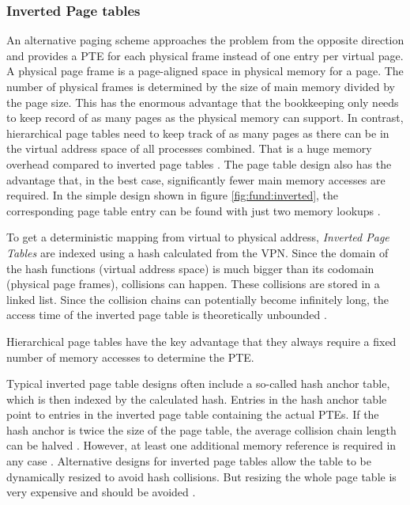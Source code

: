 \subsubsection{Inverted Page tables}
An alternative paging scheme approaches the problem from the opposite direction and provides a PTE
for each physical frame instead of one entry per virtual page.
A physical page frame is a page-aligned space in physical memory for a page.
The number of physical frames is determined by the size of main memory divided by the page size.
This has the enormous advantage that the bookkeeping only needs to keep record of as many pages
as the physical memory can support.
In contrast, hierarchical page tables need to keep track of as many pages as there can be in the virtual
address space of all processes combined. That is a huge memory overhead compared to inverted page tables
\cite{jacob1998look}.
The page table design also has the advantage that, in the best case, significantly fewer main memory
accesses are required. In the simple design shown in figure \ref{fig:fund:inverted}, the corresponding
page table entry can be found with just two memory lookups \cite{skarlatos2020elastic}.

To get a deterministic mapping from virtual to physical address, \emph{Inverted Page Tables} are indexed
using a hash calculated from the VPN.
Since the domain of the hash functions (virtual address space) is much bigger than its codomain (physical page frames),
collisions can happen. These collisions are stored in a linked list. Since
the collision chains can potentially become infinitely long, the access time of the inverted page table is theoretically
unbounded \cite{tanenbaumOS}.

Hierarchical page tables have the key advantage that they always require
a fixed number of memory accesses to determine the PTE.

Typical inverted page table designs often include a so-called hash anchor table, which is then
indexed by the calculated hash. Entries in the hash anchor table point to entries in the inverted page table
containing the actual PTEs. If the hash anchor is twice the size
of the page table, the average collision chain length can be halved \cite{jacob1998virtualissues}.
However, at least one additional memory reference is required in any case \cite{jacob1998virtualissues}.
Alternative designs for inverted page tables allow the table to be dynamically resized to avoid hash collisions.
But resizing the whole page table is very expensive and should be avoided \cite{skarlatos2020elastic}.

